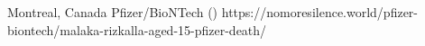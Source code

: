           {Montreal, Canada}
          {}
          {Pfizer/BioNTech}
          {}
          {
             ()
          }
          {https://nomoresilence.world/pfizer-biontech/malaka-rizkalla-aged-15-pfizer-death/}

